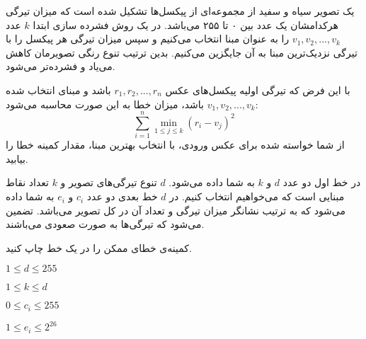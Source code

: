 \documentclass[11.5pt,a4paper,oneside]{article}
\begin{document}
\def\problemCode{Compression}
\def\problemEnglishTitle{Image Compression}
\def\problemFarsiTitle{فشرده‌سازی تصویر}
\def\timeLimit{$2$ \second}
\def\memLimit{$256$ \megabytes}
\begin{problem}
یک تصویر سیاه و سفید از مجموعه‌ای از پیکسل‌ها تشکیل شده است که میزان تیرگی هرکدامشان یک عدد بین ۰ تا ۲۵۵ می‌باشد. در یک روش فشرده سازی ابتدا $k$ عدد
$v_1, v_2, ..., v_k$
را به عنوان مبنا انتخاب می‌کنیم و سپس میزان تیرگی هر پیکسل را با تیرگی نزدیک‌ترین مبنا به آن جایگزین می‌کنیم. بدین ترتیب تنوع رنگی تصویرمان کاهش می‌یاد و فشرده‌تر می‌شود. 

با این فرض که تیرگی اولیه پیکسل‌های عکس
$r_1, r_2, ..., r_n$
باشد و مبنای انتخاب شده $v_1, v_2, ..., v_k$ باشد، میزان خطا به این صورت محاسبه می‌شود:
$$ \sum _{i=1}^ n \min _{1\leq j \leq k} (r_ i - v_ j)^2$$
از شما خواسته شده برای عکس ورودی، با انتخاب بهترین مبنا، مقدار کمینه خطا را بیابید.

در خط اول دو عدد $d$ و $k$ به شما داده می‌شود. $d$ تنوع تیرگی‌های تصویر و $k$ تعداد نقاط مبنایی است که می‌خواهیم انتخاب کنیم. در $d$
خط بعدی دو عدد $c_i$ و $e_i$
به شما داده می‌شود که به ترتیب نشانگر میزان تیرگی و تعداد آن در کل تصویر می‌باشد. تضمین می‌شود که تیرگی‌ها به صورت صعودی می‌باشند. 

\outputDescription
کمینه‌ی خطای ممکن را در یک خط چاپ کنید.

\constraints
\begin{shortitems}
	\item $1 \le d \le 255$
	\item $1 \le k \le d$
	\item $0 \le c_i \le 255$
	\item $1 \le e_i \le 2^{26}$
\end{shortitems}

\begin{example}
%
%
%
\end{example}

\end{problem}
\end{document}
